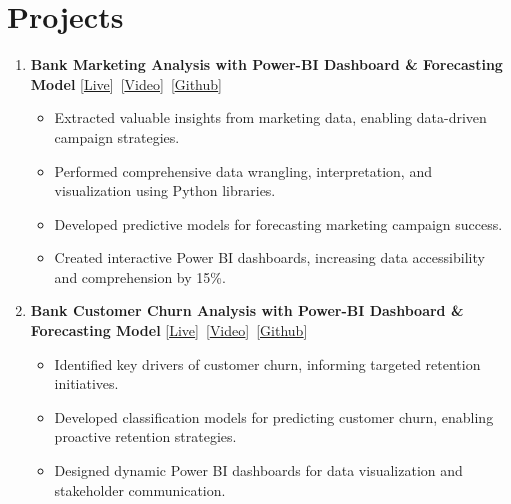 \documentclass[a4paper,10pt]{article}
\begin{document}
\section{Projects}
\begin{enumerate}[label={}, nosep, after=\strut, leftmargin=2em, itemsep=2pt]
    \item \textbf {Bank Marketing Analysis with Power-BI Dashboard \& Forecasting Model} \hfill 
    [\underline{\href{https://portuguese-bank-marketing-analysis.onrender.com}{Live}}]~[\underline{\href{https://www.linkedin.com/posts/hassankhan2608_datascience-capstoneproject-powerbi-activity-7138464571496869888-NegR?utm_source=share&utm_medium=member_desktop}{Video}}]~[\underline{\href{https://github.com/hassankhan2608/-PORTUGUESE-BANK-MARKETING-ANALYSIS}{Github}}]
        \begin{itemize}[nosep, after=\strut, itemsep=2pt]
            \item Extracted valuable insights from marketing data, enabling data-driven campaign strategies.
            \item Performed comprehensive data wrangling, interpretation, and visualization using Python libraries.
            \item Developed predictive models for forecasting marketing campaign success.
            \item Created interactive Power BI dashboards, increasing data accessibility and comprehension by 15\%.
        \end{itemize}
    \item \textbf {Bank Customer Churn Analysis with Power-BI Dashboard \& Forecasting Model} \hfill 
    [\underline{\href{https://bank-customer-churn-analysis-stmz.onrender.com}{Live}}]~[\underline{\href{https://www.linkedin.com/posts/hassankhan2608_datascience-capstoneproject-powerbi-activity-7138464571496869888-NegR?utm_source=share&utm_medium=member_desktop}{Video}}]~[\underline{\href{https://github.com/hassankhan2608/Bank-Customer-Churn-Analysis}{Github}}]
        \begin{itemize}[nosep, after=\strut, itemsep=2pt]
            \item Identified key drivers of customer churn, informing targeted retention initiatives.
            \item Developed classification models for predicting customer churn, enabling proactive retention strategies.
            \item Designed dynamic Power BI dashboards for data visualization and stakeholder communication.

\end{itemize}
\end{enumerate}
\end{document}
